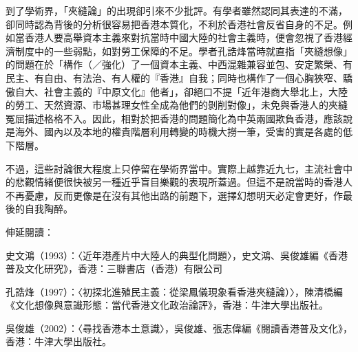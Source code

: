
到了學術界，「夾縫論」的出現卻引來不少批評。有學者雖然認同其表達的不滿，卻同時認為背後的分析很容易把香港本質化，不利於香港社會反省自身的不足。例如當香港人要高舉資本主義來對抗當時中國大陸的社會主義時，便會忽視了香港經濟制度中的一些弱點，如對勞工保障的不足。學者孔誥烽當時就直指「夾縫想像」的問題在於「構作（／強化）了一個資本主義、中西混雜兼容並包、安定繁榮、有民主、有自由、有法治、有人權的『香港』自我；同時也構作了一個心胸狹窄、驕傲自大、社會主義的『中原文化』他者」，卻絕口不提「近年港商大舉北上，大陸的勞工、天然資源、市場甚理女性全成為他們的剝削對像」，未免與香港人的夾縫冤屈描述格格不入。因此，相對於把香港的問題簡化為中英兩國欺負香港，應該說是海外、國內以及本地的權貴階層利用轉變的時機大撈一筆，受害的實是各處的低下階層。

不過，這些討論很大程度上只停留在學術界當中。實際上越靠近九七，主流社會中的悲觀情緒便很快被另一種近乎盲目樂觀的表現所蓋過。但這不是說當時的香港人不再憂慮，反而更像是在沒有其他出路的前題下，選擇幻想明天必定會更好，作最後的自我陶醉。


伸延閱讀：

史文鴻（1993）：〈近年港產片中大陸人的典型化問題〉，史文鴻、吳俊雄編《香港普及文化研究》，香港：三聯書店（香港）有限公司

孔誥烽（1997）：〈初探北進殖民主義：從梁鳳儀現象看香港夾縫論）〉，陳清橋編《文化想像與意識形態：當代香港文化政治論評》，香港：牛津大學出版社。

吳俊雄（2002）：〈尋找香港本土意識〉，吳俊雄、張志偉編《閱讀香港普及文化》，香港：牛津大學出版社。